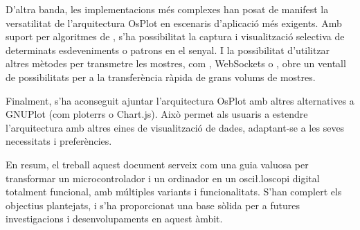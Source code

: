 \documentclass{tfgitic}[2023/06/30]
\begin{document}
D'altra banda, les implementacions més complexes han posat de manifest
la versatilitat de l'arquitectura OsPlot en escenaris d'aplicació més
exigents. Amb suport per algoritmes de , s'ha
possibilitat la captura i visualització selectiva de determinats
esdeveniments o patrons en el senyal. I la possibilitat d'utilitzar
altres mètodes per transmetre les mostres, com , WebSockets
o , obre un ventall de possibilitats per a la transferència
ràpida de grans volums de mostres.

Finalment, s'ha aconseguit ajuntar l'arquitectura OsPlot amb altres
alternatives a GNUPlot (com ploterrs o Chart.js). Això permet als
usuaris a estendre l'arquitectura amb altres eines de visualització de
dades, adaptant-se a les seves necessitats i preferències.

En resum, el treball aquest document serveix com una guia valuosa per
transformar un microcontrolador i un ordinador en un osci\l.loscopi
digital totalment funcional, amb múltiples variants i funcionalitats.
S'han complert els objectius plantejats, i s'ha proporcionat una base
sòlida per a futures investigacions i desenvolupaments en aquest
àmbit.

\printbibliography
\end{document}
